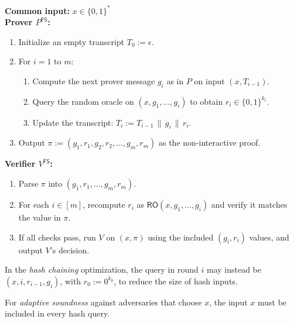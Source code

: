 \myspace

\begin{protocol}
\textbf{Common input:} $x \in \{0,1\}^*$ \\  

\textbf{Prover $P^{\mathsf{FS}}$:}
\begin{enumerate}
    \item Initialize an empty transcript $T_0 := \epsilon$.
    \item For $i = 1$ to $m$:
    \begin{enumerate}
        \item Compute the next prover message $g_i$ as in $P$ on input $(x, T_{i-1})$.
        \item Query the random oracle on $(x, g_1,\ldots,g_i)$ to obtain $r_i \in \{0,1\}^{k_i}$.
        \item Update the transcript: $T_i := T_{i-1} \,\|\, g_i \,\|\, r_i$.
    \end{enumerate}
    \item Output $\pi := (g_1, r_1, g_2, r_2, \ldots, g_m, r_m)$ as the non-interactive proof.
\end{enumerate}

\textbf{Verifier $V^{\mathsf{FS}}$:}
\begin{enumerate}
    \item Parse $\pi$ into $(g_1, r_1, \ldots, g_m, r_m)$.
    \item For each $i \in [m]$, recompute $r_i$ as $\mathsf{RO}(x, g_1,\ldots,g_i)$ and verify it matches the value in $\pi$.
    \item If all checks pass, run $V$ on $(x, \pi)$ using the included $(g_i, r_i)$ values, and output $V$’s decision.
\end{enumerate}
\end{protocol}

\myspace

\begin{remark}
In the \emph{hash chaining} optimization, the query in round $i$ may instead be $(x,i,r_{i-1},g_i)$, with $r_0 := 0^{k_0}$, to reduce the size of hash inputs.
\end{remark}
\begin{remark}
For \emph{adaptive soundness} against adversaries that choose $x$, the input $x$ must be included in every hash query.
\end{remark}